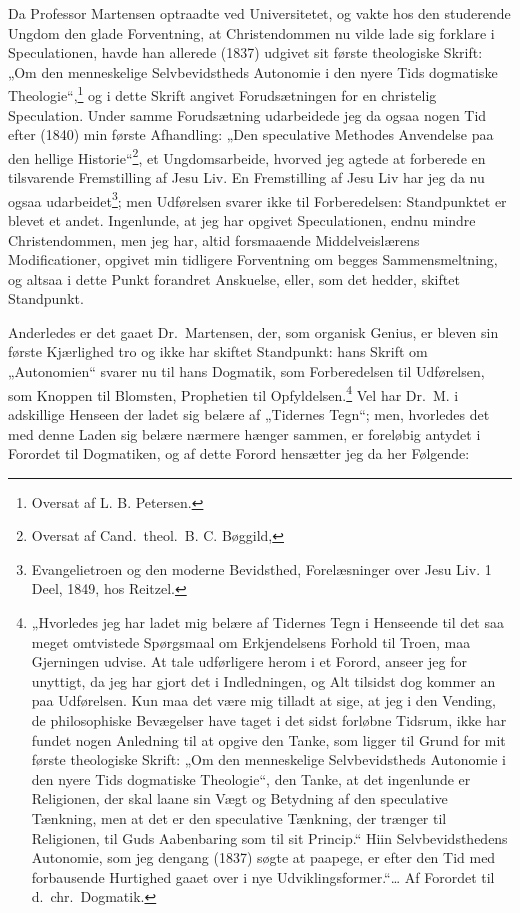 Da Professor Martensen optraadte ved Universitetet, og vakte hos
den studerende Ungdom den glade Forventning, at Christendommen nu
vilde lade sig forklare i Speculationen, havde han allerede (1837)
udgivet sit første theologiske Skrift: „Om den menneskelige
Selvbevidstheds Autonomie i den nyere Tids dogmatiske
Theologie“,\footnote{Oversat af L. B. Petersen.} og i dette Skrift
angivet Forudsætningen for en christelig Speculation. Under samme
Forudsætning udarbeidede jeg da ogsaa nogen Tid efter (1840) min
første Afhandling: „Den speculative Methodes Anvendelse paa den
hellige Historie“\footnote{Oversat af Cand.\ theol.\ B. C.
Bøggild,}, et Ungdomsarbeide, hvorved
 jeg agtede at forberede en tilsvarende Fremstilling af Jesu Liv.
En Fremstilling af Jesu Liv har jeg da nu ogsaa
udarbeidet\footnote{Evangelietroen og den moderne Bevidsthed,
Forelæsninger over Jesu Liv. 1 Deel, 1849, hos Reitzel.};
men Udførelsen svarer ikke til Forberedelsen: Standpunktet er
blevet et andet. Ingenlunde, at jeg har opgivet Speculationen,
endnu mindre Christendommen, men jeg har, altid forsmaaende
Middelveislærens Modificationer, opgivet min tidligere Forventning
om begges Sammensmeltning, og altsaa i dette Punkt forandret
Anskuelse, eller, som det hedder, skiftet Standpunkt.

Anderledes er det gaaet Dr.\ Martensen, der, som organisk Genius,
er bleven sin første Kjærlighed tro og ikke har skiftet
Standpunkt: hans Skrift om „Autonomien“ svarer nu til hans
Dogmatik, som Forberedelsen til Udførelsen, som Knoppen til
Blomsten, Prophetien til Opfyldelsen.\footnote{„Hvorledes jeg har
ladet mig belære af Tidernes Tegn i Henseende til det saa meget
omtvistede Spørgsmaal om Erkjendelsens Forhold til Troen, maa
Gjerningen udvise. At tale udførligere herom i et Forord, anseer
jeg for unyttigt, da jeg har gjort det i Indledningen, og Alt
tilsidst dog kommer an paa Udførelsen. Kun maa det være mig
tilladt at sige, at jeg i den Vending, de philosophiske Bevægelser
have taget i det sidst forløbne Tidsrum, ikke har fundet nogen
Anledning til at opgive den Tanke, som ligger til Grund for mit
første theologiske Skrift: „Om den menneskelige Selvbevidstheds
Autonomie i den nyere Tids dogmatiske Theologie“, den Tanke, at
det ingenlunde er Religionen, der skal laane sin Vægt og
Betydning af den speculative Tænkning, men at det er den
speculative Tænkning, der trænger til Religionen, til Guds
Aabenbaring som til sit Princip.“ Hiin Selvbevidsthedens Autonomie,
som jeg dengang (1837) søgte at paapege, er efter den Tid med
forbausende Hurtighed gaaet over i nye
Udviklingsformer.“\ldots{} Af Forordet til d.\ chr.\ Dogmatik.}
Vel har Dr.\ M. i adskillige Henseen%
der ladet sig belære af „Tidernes Tegn“; men, hvorledes det med
denne Laden sig belære nærmere hænger sammen, er foreløbig antydet
i Forordet til Dogmatiken, og af dette Forord hensætter jeg da her
Følgende:

